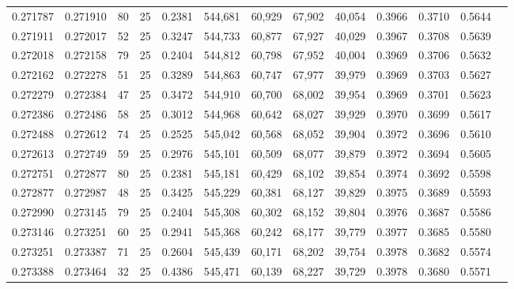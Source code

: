\begin{tabular}{rrrrrrrrrrrrr}
0.271787 & 0.271910 &    80 &  25 &                                     0.2381 & 544,681 &  60,929 &  67,902 &  40,054 & 0.3966 & 0.3710 & 0.5644 \\
0.271911 & 0.272017 &    52 &  25 &                                     0.3247 & 544,733 &  60,877 &  67,927 &  40,029 & 0.3967 & 0.3708 & 0.5639 \\
0.272018 & 0.272158 &    79 &  25 &                                     0.2404 & 544,812 &  60,798 &  67,952 &  40,004 & 0.3969 & 0.3706 & 0.5632 \\
0.272162 & 0.272278 &    51 &  25 &                                     0.3289 & 544,863 &  60,747 &  67,977 &  39,979 & 0.3969 & 0.3703 & 0.5627 \\
0.272279 & 0.272384 &    47 &  25 &                                     0.3472 & 544,910 &  60,700 &  68,002 &  39,954 & 0.3969 & 0.3701 & 0.5623 \\
0.272386 & 0.272486 &    58 &  25 &                                     0.3012 & 544,968 &  60,642 &  68,027 &  39,929 & 0.3970 & 0.3699 & 0.5617 \\
0.272488 & 0.272612 &    74 &  25 &                                     0.2525 & 545,042 &  60,568 &  68,052 &  39,904 & 0.3972 & 0.3696 & 0.5610 \\
0.272613 & 0.272749 &    59 &  25 &                                     0.2976 & 545,101 &  60,509 &  68,077 &  39,879 & 0.3972 & 0.3694 & 0.5605 \\
0.272751 & 0.272877 &    80 &  25 &                                     0.2381 & 545,181 &  60,429 &  68,102 &  39,854 & 0.3974 & 0.3692 & 0.5598 \\
0.272877 & 0.272987 &    48 &  25 &                                     0.3425 & 545,229 &  60,381 &  68,127 &  39,829 & 0.3975 & 0.3689 & 0.5593 \\
0.272990 & 0.273145 &    79 &  25 &                                     0.2404 & 545,308 &  60,302 &  68,152 &  39,804 & 0.3976 & 0.3687 & 0.5586 \\
0.273146 & 0.273251 &    60 &  25 &                                     0.2941 & 545,368 &  60,242 &  68,177 &  39,779 & 0.3977 & 0.3685 & 0.5580 \\
0.273251 & 0.273387 &    71 &  25 &                                     0.2604 & 545,439 &  60,171 &  68,202 &  39,754 & 0.3978 & 0.3682 & 0.5574 \\
0.273388 & 0.273464 &    32 &  25 &                                     0.4386 & 545,471 &  60,139 &  68,227 &  39,729 & 0.3978 & 0.3680 & 0.5571 \\

\end{tabular}
